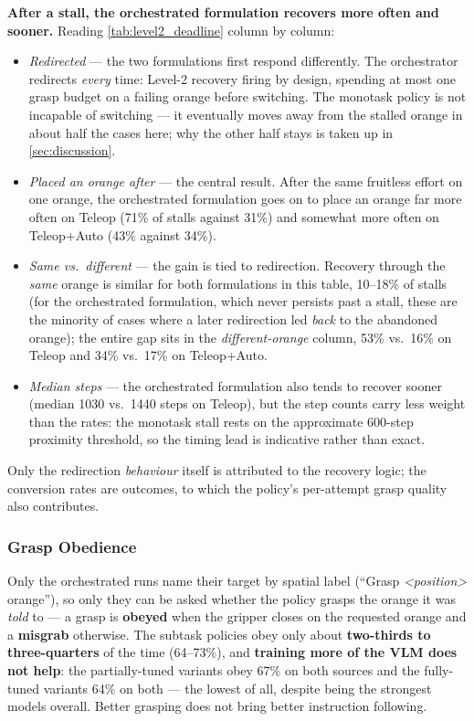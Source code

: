 \textbf{After a stall, the orchestrated formulation recovers more often and sooner.} Reading \cref{tab:level2_deadline} column by column:
\begin{itemize}[noitemsep, topsep=2pt, leftmargin=1.6em]
    \item \emph{Redirected} --- the two formulations first respond differently. The orchestrator redirects \emph{every} time: Level-2 recovery firing by design, spending at most one grasp budget on a failing orange before switching. The monotask policy is not incapable of switching --- it eventually moves away from the stalled orange in about half the cases here; why the other half stays is taken up in \cref{sec:discussion}.
    \item \emph{Placed an orange after} --- the central result. After the same fruitless effort on one orange, the orchestrated formulation goes on to place an orange far more often on Teleop (71\% of stalls against 31\%) and somewhat more often on Teleop+Auto (43\% against 34\%).
    \item \emph{Same vs.\ different} --- the gain is tied to redirection. Recovery through the \emph{same} orange is similar for both formulations in this table, 10--18\% of stalls (for the orchestrated formulation, which never persists past a stall, these are the minority of cases where a later redirection led \emph{back} to the abandoned orange); the entire gap sits in the \emph{different-orange} column, 53\% vs.\ 16\% on Teleop and 34\% vs.\ 17\% on Teleop+Auto.
    \item \emph{Median steps} --- the orchestrated formulation also tends to recover sooner (median 1030 vs.\ 1440 steps on Teleop), but the step counts carry less weight than the rates: the monotask stall rests on the approximate 600-step proximity threshold, so the timing lead is indicative rather than exact.
\end{itemize}
Only the redirection \emph{behaviour} itself is attributed to the recovery logic; the conversion rates are outcomes, to which the policy's per-attempt grasp quality also contributes.

\subsubsection{Grasp Obedience}
\label{sec:obedience}

Only the orchestrated runs name their target by spatial label (``Grasp \emph{<position>} orange''), so only they can be asked whether the policy grasps the orange it was \emph{told} to --- a grasp is \textbf{obeyed} when the gripper closes on the requested orange and a \textbf{misgrab} otherwise. The subtask policies obey only about \textbf{two-thirds to three-quarters} of the time (64--73\%), and \textbf{training more of the VLM does not help}: the partially-tuned variants obey 67\% on both sources and the fully-tuned variants 64\% on both --- the lowest of all, despite being the strongest models overall. Better grasping does not bring better instruction following.

